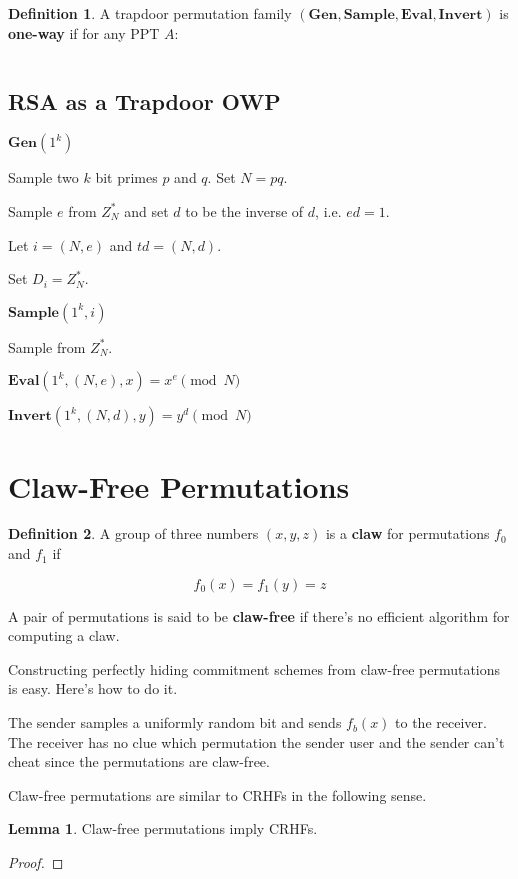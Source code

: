 \documentclass{article}
\theoremstyle{definition}
\newtheorem{definition}{Definition}
\newtheorem{lemma}[theorem]{Lemma}
\newcommand{\Gen}{\textbf{Gen}}
\newcommand{\Sample}{\textbf{Sample}}
\newcommand{\Eval}{\textbf{Eval}}
\newcommand{\Invert}{\textbf{Invert}}
\begin{document}
\begin{definition}
    A trapdoor permutation family $(\Gen, \Sample, \Eval, \Invert)$
    is \textbf{one-way} if for any PPT $A$:

    \[ \]
\end{definition}

\subsection{RSA as a Trapdoor OWP}

$\Gen(1^{k})$

Sample two $k$ bit primes $p$ and $q$. Set $N = pq$.

Sample $e$ from $Z^{*}_{N}$ and set $d$ to be the inverse
of $d$, i.e. $ed = 1$.

Let $i = (N, e)$ and $td = (N,d)$.

Set $D_{i} = Z^{*}_{N}$.

$\Sample(1^{k}, i)$

Sample from $Z^{*}_{N}$.

$\Eval(1^{k},(N,e), x) = x^{e} \pmod{N}$

$\Invert(1^{k},(N,d), y) = y^{d} \pmod{N}$



\newpage

\section{Claw-Free Permutations}

\begin{definition}
    A group of three numbers $(x,y,z)$ is a \textbf{claw} for permutations $f_{0}$ and $f_{1}$ if

    \[ f_{0}(x) = f_{1}(y) = z \]
\end{definition}

A pair of permutations is said to be \textbf{claw-free} if there's no efficient algorithm for computing a claw.

Constructing perfectly hiding commitment schemes from claw-free permutations is easy. Here's how to do it.

The sender samples a uniformly random bit and sends $f_{b}(x)$ to the receiver. The receiver has no clue
which permutation the sender user and the sender can't cheat since the permutations are claw-free.

Claw-free permutations are similar to CRHFs in the following sense.

\begin{lemma}
    Claw-free permutations imply CRHFs.
\end{lemma}
\begin{proof}
    
\end{proof}
\end{document}
